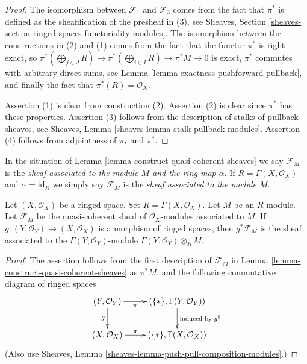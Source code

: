 \begin{proof}
The isomorphism between $\mathcal{F}_1$ and $\mathcal{F}_3$
comes from the fact that $\pi^*$ is defined as the sheafification
of the presheaf in (3), see Sheaves, Section
\ref{sheaves-section-ringed-spaces-functoriality-modules}.
The isomorphism between the constructions in (2) and (1) comes
from the fact that the functor $\pi^*$ is right exact, so
$\pi^*(\bigoplus_{j \in J} R) \to \pi^*(\bigoplus_{i \in I} R) \to
\pi^*M \to 0$ is exact, $\pi^*$ commutes with arbitrary
direct sums, see Lemma \ref{lemma-exactness-pushforward-pullback},
and finally the fact that $\pi^*(R) = \mathcal{O}_X$.

\medskip\noindent
Assertion (1) is clear from construction (2).
Assertion (2) is clear since $\pi^*$ has these properties.
Assertion (3) follows from the description of stalks of
pullback sheaves, see
Sheaves, Lemma \ref{sheaves-lemma-stalk-pullback-modules}.
Assertion (4) follows from adjointness of $\pi_*$ and
$\pi^*$.
\end{proof}

\begin{definition}
\label{definition-sheaf-associated}
In the situation of Lemma \ref{lemma-construct-quasi-coherent-sheaves}
we say $\mathcal{F}_M$ is the {\it sheaf associated to the module $M$
and the ring map $\alpha$}. If $R = \Gamma(X, \mathcal{O}_X)$
and $\alpha = \text{id}_R$ we simply say $\mathcal{F}_M$ is the
{\it sheaf associated to the module $M$}.
\end{definition}


\begin{lemma}
\label{lemma-restrict-quasi-coherent}
Let $(X, \mathcal{O}_X)$ be a ringed space.
Set $R = \Gamma(X, \mathcal{O}_X)$.
Let $M$ be an $R$-module.
Let $\mathcal{F}_M$ be the quasi-coherent sheaf of
$\mathcal{O}_X$-modules associated to $M$.
If $g : (Y, \mathcal{O}_Y) \to (X, \mathcal{O}_X)$
is a morphism of ringed spaces, then
$g^*\mathcal{F}_M$ is the sheaf associated
to the $\Gamma(Y, \mathcal{O}_Y)$-module
$\Gamma(Y, \mathcal{O}_Y) \otimes_R M$.
\end{lemma}

\begin{proof}
The assertion follows from the first description
of $\mathcal{F}_M$ in Lemma \ref{lemma-construct-quasi-coherent-sheaves}
as $\pi^*M$, and the following commutative diagram
of ringed spaces
$$
\xymatrix{
(Y, \mathcal{O}_Y) \ar[r]_-\pi \ar[d]_g &
(\{*\}, \Gamma(Y, \mathcal{O}_Y)) \ar[d]^{\text{induced by }g^\sharp} \\
(X, \mathcal{O}_X) \ar[r]^-\pi &
(\{*\}, \Gamma(X, \mathcal{O}_X))
}
$$
(Also use Sheaves, Lemma \ref{sheaves-lemma-push-pull-composition-modules}.)
\end{proof}

